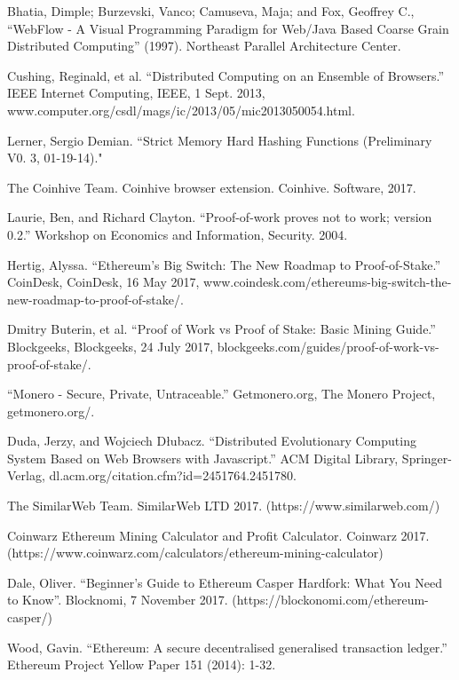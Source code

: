\documentclass[runningheads]{llncs}
\begin{document}
\begin{thebibliography}{1}
Bhatia, Dimple; Burzevski, Vanco; Camuseva, Maja; and Fox, Geoffrey C., ``WebFlow - A Visual Programming Paradigm for Web/Java Based Coarse Grain Distributed Computing'' (1997).
Northeast Parallel Architecture Center.

 Cushing, Reginald, et al. ``Distributed Computing on an Ensemble of Browsers.'' IEEE Internet Computing, IEEE, 1 Sept. 2013, www.computer.org/csdl/mags/ic/2013/05/mic2013050054.html.

 Lerner, Sergio Demian. ``Strict Memory Hard Hashing Functions (Preliminary V0. 3, 01-19-14)."

The Coinhive Team. Coinhive browser extension. Coinhive. Software, 2017.

Laurie, Ben, and Richard Clayton. ``Proof-of-work proves not to work; version 0.2.'' Workshop on Economics and Information, Security. 2004.

Hertig, Alyssa. ``Ethereum's Big Switch: The New Roadmap to Proof-of-Stake.'' CoinDesk, CoinDesk, 16 May 2017, www.coindesk.com/ethereums-big-switch-the-new-roadmap-to-proof-of-stake/. 

Dmitry Buterin, et al. ``Proof of Work vs Proof of Stake: Basic Mining Guide.'' Blockgeeks, Blockgeeks, 24 July 2017, blockgeeks.com/guides/proof-of-work-vs-proof-of-stake/. 


 ``Monero - Secure, Private, Untraceable.'' Getmonero.org, The Monero Project, getmonero.org/.

 Duda, Jerzy, and Wojciech Dłubacz. ``Distributed Evolutionary Computing System Based on Web Browsers with Javascript.'' ACM Digital Library, Springer-Verlag, dl.acm.org/citation.cfm?id=2451764.2451780.

 The SimilarWeb Team. SimilarWeb LTD 2017. (https://www.similarweb.com/)

Coinwarz Ethereum Mining Calculator and Profit Calculator. Coinwarz 2017. (https://www.coinwarz.com/calculators/ethereum-mining-calculator)

Dale, Oliver. ``Beginner's Guide to Ethereum Casper Hardfork: What You Need to Know''. Blocknomi, 7 November 2017. (https://blockonomi.com/ethereum-casper/)

Wood, Gavin. ``Ethereum: A secure decentralised generalised transaction ledger.'' Ethereum Project Yellow Paper 151 (2014): 1-32.


\end{thebibliography}
\end{document}
